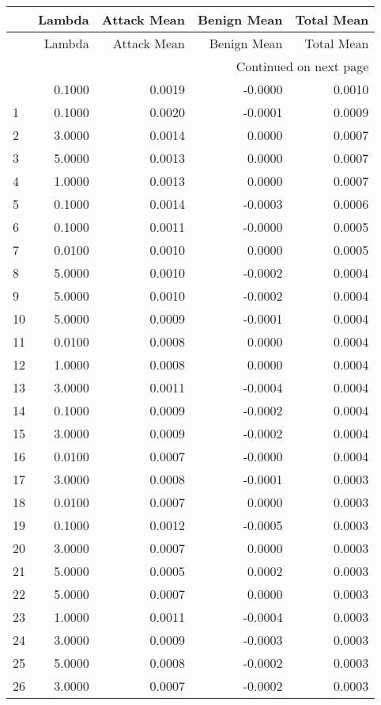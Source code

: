 \begin{longtable}{lrrrr}
\toprule
 & Lambda & Attack Mean & Benign Mean & Total Mean \\
\midrule
\endfirsthead
\toprule
 & Lambda & Attack Mean & Benign Mean & Total Mean \\
\midrule
\endhead
\midrule
\multicolumn{5}{r}{Continued on next page} \\
\midrule
\endfoot
\bottomrule
\endlastfoot
0 & 0.1000 & 0.0019 & -0.0000 & 0.0010 \\
1 & 0.1000 & 0.0020 & -0.0001 & 0.0009 \\
2 & 3.0000 & 0.0014 & 0.0000 & 0.0007 \\
3 & 5.0000 & 0.0013 & 0.0000 & 0.0007 \\
4 & 1.0000 & 0.0013 & 0.0000 & 0.0007 \\
5 & 0.1000 & 0.0014 & -0.0003 & 0.0006 \\
6 & 0.1000 & 0.0011 & -0.0000 & 0.0005 \\
7 & 0.0100 & 0.0010 & 0.0000 & 0.0005 \\
8 & 5.0000 & 0.0010 & -0.0002 & 0.0004 \\
9 & 5.0000 & 0.0010 & -0.0002 & 0.0004 \\
10 & 5.0000 & 0.0009 & -0.0001 & 0.0004 \\
11 & 0.0100 & 0.0008 & 0.0000 & 0.0004 \\
12 & 1.0000 & 0.0008 & 0.0000 & 0.0004 \\
13 & 3.0000 & 0.0011 & -0.0004 & 0.0004 \\
14 & 0.1000 & 0.0009 & -0.0002 & 0.0004 \\
15 & 3.0000 & 0.0009 & -0.0002 & 0.0004 \\
16 & 0.0100 & 0.0007 & -0.0000 & 0.0004 \\
17 & 3.0000 & 0.0008 & -0.0001 & 0.0003 \\
18 & 0.0100 & 0.0007 & 0.0000 & 0.0003 \\
19 & 0.1000 & 0.0012 & -0.0005 & 0.0003 \\
20 & 3.0000 & 0.0007 & 0.0000 & 0.0003 \\
21 & 5.0000 & 0.0005 & 0.0002 & 0.0003 \\
22 & 5.0000 & 0.0007 & 0.0000 & 0.0003 \\
23 & 1.0000 & 0.0011 & -0.0004 & 0.0003 \\
24 & 3.0000 & 0.0009 & -0.0003 & 0.0003 \\
25 & 5.0000 & 0.0008 & -0.0002 & 0.0003 \\
26 & 3.0000 & 0.0007 & -0.0002 & 0.0003 \\

\end{longtable}
